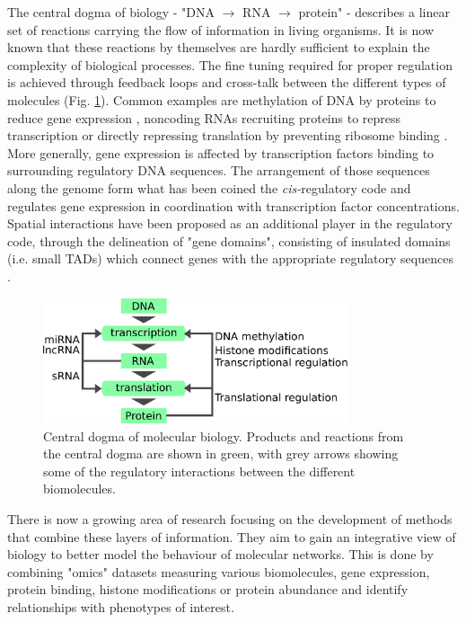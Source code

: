 The central dogma of biology - "DNA $\rightarrow$ RNA $\rightarrow$ protein" - describes a linear set of reactions carrying the flow of information in living organisms. It is now known that these reactions by themselves are hardly sufficient to explain the complexity of biological processes. The fine tuning required for proper regulation is achieved through feedback loops and cross-talk between the different types of molecules (Fig. \ref{fig:01-02:central-dogma}). Common examples are methylation of DNA by proteins to reduce gene expression \cite{zemachGenomeWideEvolutionaryAnalysis2010}, noncoding RNAs recruiting proteins to repress transcription \cite{wangLongNoncodingRNA2018} or directly repressing translation by preventing ribosome binding \cite{sharmaSmallRNARegulates2007,vecerekControlFurSynthesis2007}. More generally, gene expression is affected by transcription factors binding to surrounding regulatory DNA sequences. The arrangement of those sequences along the genome form what has been coined the \textit{cis-}regulatory code \cite{yanez-cunaDecipheringTranscriptionalCisregulatory2013} and regulates gene expression in coordination with transcription factor concentrations. Spatial interactions have been proposed as an additional player in the regulatory code, through the delineation of "gene domains", consisting of insulated domains (i.e. small \acrshort{TAD}s) which connect genes with the appropriate regulatory sequences \cite{mozziconacci3DGenomeShapes2020,symmonsFunctionalTopologicalCharacteristics2014}.

\begin{figure}[htb]
    \centering
    \includegraphics[width=0.8\textwidth]{Parts/Part01/gfx/central_dogma_regulation.pdf}
    \caption[Central dogma of molecular biology.]{Central dogma of molecular biology. Products and reactions from the central dogma are shown in green, with grey arrows showing some of the regulatory interactions between the different biomolecules.}
    \label{fig:01-02:central-dogma}
\end{figure}

There is now a growing area of research focusing on the development of methods that combine these layers of information. They aim to gain an integrative view of biology to better model the behaviour of molecular networks. This is done by combining "omics" datasets measuring various biomolecules, gene expression, protein binding, histone modifications or protein abundance and identify relationships with phenotypes of interest.

